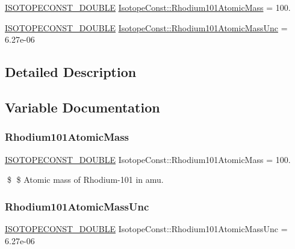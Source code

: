\begin{DoxyCompactItemize}
\item 
\mbox{\hyperlink{group___isotope_const-_macros_ga8f45a7272ce02c0b4c65c44636ed719a}{I\+S\+O\+T\+O\+P\+E\+C\+O\+N\+S\+T\+\_\+\+D\+O\+U\+B\+LE}} \mbox{\hyperlink{group___isotope_const-_rhodium-_rh101_ga9d9213fc1fea4ae4b242b536b1b44d1a}{Isotope\+Const\+::\+Rhodium101\+Atomic\+Mass}} = 100.
\item 
\mbox{\hyperlink{group___isotope_const-_macros_ga8f45a7272ce02c0b4c65c44636ed719a}{I\+S\+O\+T\+O\+P\+E\+C\+O\+N\+S\+T\+\_\+\+D\+O\+U\+B\+LE}} \mbox{\hyperlink{group___isotope_const-_rhodium-_rh101_ga027bf1d0e9790e91b7dc983f6fa39f95}{Isotope\+Const\+::\+Rhodium101\+Atomic\+Mass\+Unc}} = 6.\+27e-\/06
\end{DoxyCompactItemize}


\subsection{Detailed Description}


\subsection{Variable Documentation}
\mbox{\label{group___isotope_const-_rhodium-_rh101_ga9d9213fc1fea4ae4b242b536b1b44d1a}} 
\subsubsection{\texorpdfstring{Rhodium101\+Atomic\+Mass}{Rhodium101AtomicMass}}
{\footnotesize\ttfamily \mbox{\hyperlink{group___isotope_const-_macros_ga8f45a7272ce02c0b4c65c44636ed719a}{I\+S\+O\+T\+O\+P\+E\+C\+O\+N\+S\+T\+\_\+\+D\+O\+U\+B\+LE}} Isotope\+Const\+::\+Rhodium101\+Atomic\+Mass = 100.}

\$ \$ Atomic mass of Rhodium-\/101 in amu. \mbox{\label{group___isotope_const-_rhodium-_rh101_ga027bf1d0e9790e91b7dc983f6fa39f95}} 
\subsubsection{\texorpdfstring{Rhodium101\+Atomic\+Mass\+Unc}{Rhodium101AtomicMassUnc}}
{\footnotesize\ttfamily \mbox{\hyperlink{group___isotope_const-_macros_ga8f45a7272ce02c0b4c65c44636ed719a}{I\+S\+O\+T\+O\+P\+E\+C\+O\+N\+S\+T\+\_\+\+D\+O\+U\+B\+LE}} Isotope\+Const\+::\+Rhodium101\+Atomic\+Mass\+Unc = 6.\+27e-\/06}


